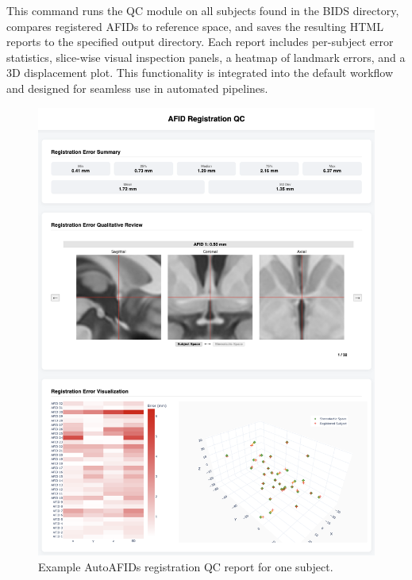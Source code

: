 This command runs the QC module on all subjects found in the BIDS directory, compares registered AFIDs to reference space, and saves the resulting HTML reports to the specified output directory. Each report includes per-subject error statistics, slice-wise visual inspection panels, a heatmap of landmark errors, and a 3D displacement plot. This functionality is integrated into the default workflow and designed for seamless use in automated pipelines.
\begin{figure}
    \centering
    \includegraphics[width=0.95\linewidth]{figs/figuresupregqc.png}
    \caption{Example AutoAFIDs registration QC report for one subject.}
    \label{fig:figuresupregqc}
\end{figure}
\newpage
